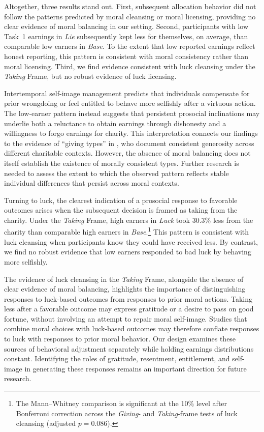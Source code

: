 \documentclass{article}
\begin{document}
\par
Altogether, three results stand out. First, subsequent allocation behavior did not follow the patterns predicted by moral cleansing or moral licensing, providing no clear evidence of moral balancing in our setting. Second, participants with low Task~1 earnings in \textit{Lie} subsequently kept less for themselves, on average, than comparable low earners in \textit{Base}. To the extent that low reported earnings reflect honest reporting, this pattern is consistent with moral consistency rather than moral licensing. Third, we find evidence consistent with luck cleansing under the \textit{Taking} Frame, but no robust evidence of luck licensing.
\par
Intertemporal self-image management predicts that individuals compensate for prior wrongdoing or feel entitled to behave more selfishly after a virtuous action. The low-earner pattern instead suggests that persistent prosocial inclinations may underlie both a reluctance to obtain earnings through dishonesty and a willingness to forgo earnings for charity. This interpretation connects our findings to the evidence of ``giving types'' in \textcite{deOliveira2011}, who document consistent generosity across different charitable contexts. However, the absence of moral balancing does not itself establish the existence of morally consistent types. Further research is needed to assess the extent to which the observed pattern reflects stable individual differences that persist across moral contexts.
\par
Turning to luck, the clearest indication of a prosocial response to favorable outcomes arises when the subsequent decision is framed as taking from the charity. Under the \textit{Taking} Frame, high earners in \textit{Luck} took 30.3\% less from the charity than comparable high earners in \textit{Base}.\footnote{The Mann--Whitney comparison is significant at the 10\% level after Bonferroni correction across the \textit{Giving}- and \textit{Taking}-frame tests of luck cleansing (adjusted $p=0.086$).} This pattern is consistent with luck cleansing when participants know they could have received less. By contrast, we find no robust evidence that low earners responded to bad luck by behaving more selfishly.
\par
The evidence of luck cleansing in the \textit{Taking} Frame, alongside the absence of clear evidence of moral balancing, highlights the importance of distinguishing responses to luck-based outcomes from responses to prior moral actions. Taking less after a favorable outcome may express gratitude or a desire to pass on good fortune, without involving an attempt to repair moral self-image. Studies that combine moral choices with luck-based outcomes may therefore conflate responses to luck with responses to prior moral behavior. Our design examines these sources of behavioral adjustment separately while holding earnings distributions constant. Identifying the roles of gratitude, resentment, entitlement, and self-image in generating these responses remains an important direction for future research.
\end{document}
